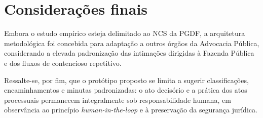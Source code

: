 
\section{Considerações finais}

Embora o estudo empírico esteja delimitado ao NCS da PGDF, a arquitetura
metodológica foi concebida para adaptação a outros órgãos da Advocacia
Pública, considerando a elevada padronização das intimações dirigidas à
Fazenda Pública e dos fluxos de contencioso repetitivo.

Ressalte-se, por fim, que o protótipo proposto se limita a sugerir
classificações, encaminhamentos e minutas padronizadas: o ato decisório e a
prática dos atos processuais permanecem integralmente sob responsabilidade
humana, em observância ao princípio \textit{human-in-the-loop} e à preservação
da segurança jurídica.
